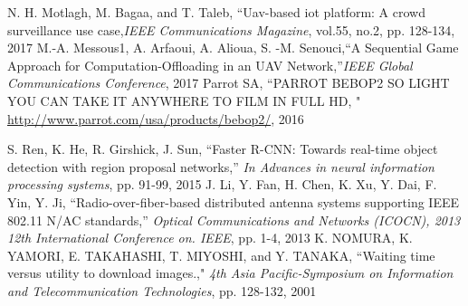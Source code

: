 \documentclass{ieeeaccess}
\begin{document}
\begin{thebibliography}{1}
N. H. Motlagh, M. Bagaa, and T. Taleb, ``Uav-based iot platform: A crowd surveillance use case,\emph{IEEE Communications Magazine}, vol.55, no.2, pp. 128-134, 2017
 M.-A. Messous1, A. Arfaoui, A. Alioua, S. -M. Senouci,``A Sequential Game Approach for Computation-Offloading in an UAV Network,''\emph{IEEE Global Communications Conference}, 2017 
 Parrot SA, ``PARROT BEBOP2 SO LIGHT YOU CAN TAKE IT
ANYWHERE TO FILM IN FULL HD, "
\url{http://www.parrot.com/usa/products/bebop2/}, 2016

 S. Ren, K. He, R. Girshick, J. Sun, ``Faster R-CNN: Towards
real-time object detection with region proposal networks,'' \emph{In Advances in neural information processing systems}, pp. 91-99, 2015
 J. Li, Y. Fan, H. Chen, K. Xu, Y. Dai, F. Yin, Y. Ji,  ``Radio-over-fiber-based distributed antenna systems supporting IEEE 802.11 N/AC standards,'' \emph{Optical Communications and Networks (ICOCN), 2013 12th International Conference on. IEEE}, pp. 1-4, 2013
K. NOMURA, K. YAMORI, E. TAKAHASHI, T. MIYOSHI, and Y. TANAKA, ``Waiting time versus utility to download images.,"  \emph{4th Asia Pacific-Symposium on Information and Telecommunication Technologies}, pp. 128-132, 2001 

\end{thebibliography}


\EOD
\end{document}
